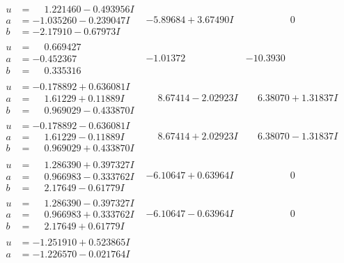 \documentclass[1p]{elsarticle_modified}
\theoremstyle{definition}
\begin{document}
$$\begin{array}{c|c|c}
\begin{aligned}
u &= \phantom{-}1.221460 - 0.493956 I \\
a &= -1.035260 - 0.239047 I \\
b &= -2.17910 - 0.67973 I\end{aligned}
 & -5.89684 + 3.67490 I & \phantom{-0.000000 } 0 \\ \hline\begin{aligned}
u &= \phantom{-}0.669427\phantom{ +0.000000I} \\
a &= -0.452367\phantom{ +0.000000I} \\
b &= \phantom{-}0.335316\phantom{ +0.000000I}\end{aligned}
 & -1.01372\phantom{ +0.000000I} & -10.3930\phantom{ +0.000000I} \\ \hline\begin{aligned}
u &= -0.178892 + 0.636081 I \\
a &= \phantom{-}1.61229 + 0.11889 I \\
b &= \phantom{-}0.969029 - 0.433870 I\end{aligned}
 & \phantom{-}8.67414 - 2.02923 I & \phantom{-}6.38070 + 1.31837 I \\ \hline\begin{aligned}
u &= -0.178892 - 0.636081 I \\
a &= \phantom{-}1.61229 - 0.11889 I \\
b &= \phantom{-}0.969029 + 0.433870 I\end{aligned}
 & \phantom{-}8.67414 + 2.02923 I & \phantom{-}6.38070 - 1.31837 I \\ \hline\begin{aligned}
u &= \phantom{-}1.286390 + 0.397327 I \\
a &= \phantom{-}0.966983 - 0.333762 I \\
b &= \phantom{-}2.17649 - 0.61779 I\end{aligned}
 & -6.10647 + 0.63964 I & \phantom{-0.000000 } 0 \\ \hline\begin{aligned}
u &= \phantom{-}1.286390 - 0.397327 I \\
a &= \phantom{-}0.966983 + 0.333762 I \\
b &= \phantom{-}2.17649 + 0.61779 I\end{aligned}
 & -6.10647 - 0.63964 I & \phantom{-0.000000 } 0 \\ \hline\begin{aligned}
u &= -1.251910 + 0.523865 I \\
a &= -1.226570 - 0.021764 I \\

\end{aligned}
\end{array}$$
\end{document}
